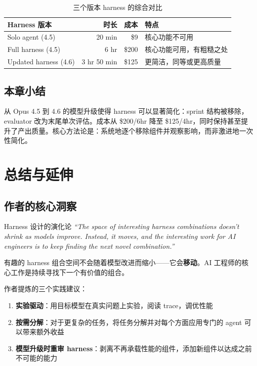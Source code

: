\documentclass[a4paper]{article}
\begin{document}
\begin{table}[H]
\centering
\begin{tabular}{lrrp{5cm}}
\toprule
\textbf{Harness 版本} & \textbf{时长} & \textbf{成本} & \textbf{特点} \\
\midrule
Solo agent (4.5) & 20 min & \$9 & 核心功能不可用 \\
Full harness (4.5) & 6 hr & \$200 & 核心功能可用，有粗糙之处 \\
Updated harness (4.6) & 3 hr 50 min & \$125 & 更简洁，同等或更高质量 \\
\bottomrule
\end{tabular}
\caption{三个版本 harness 的综合对比}
\end{table}

\subsection{本章小结}

从 Opus 4.5 到 4.6 的模型升级使得 harness 可以显著简化：sprint 结构被移除，evaluator 改为末尾单次评估。成本从 \$200/6hr 降至 \$125/4hr，同时保持甚至提升了产出质量。核心方法论是：系统地逐个移除组件并观察影响，而非激进地一次性简化。

\section{总结与延伸}

\subsection{作者的核心洞察}

\begin{importantbox}{Harness 设计的演化论}
\textit{``The space of interesting harness combinations doesn't shrink as models improve. Instead, it moves, and the interesting work for AI engineers is to keep finding the next novel combination.''}

有趣的 harness 组合空间不会随着模型改进而缩小——它会\textbf{移动}。AI 工程师的核心工作是持续寻找下一个有价值的组合。
\end{importantbox}

作者提炼的三个实践建议：

\begin{enumerate}
    \item \textbf{实验驱动}：用目标模型在真实问题上实验，阅读 trace，调优性能
    \item \textbf{按需分解}：对于更复杂的任务，将任务分解并对每个方面应用专门的 agent 可以带来额外收益
    \item \textbf{模型升级时重审 harness}：剥离不再承载性能的组件，添加新组件以达成之前不可能的能力
\end{enumerate}
\end{document}
